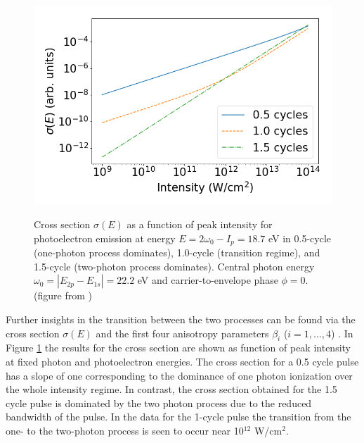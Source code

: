 \begin{figure}[!ht]
\centering
\includegraphics[width=0.49\linewidth]{figs/Photo_ionization/short_pulse/beta_0_cyc.png}\\
\caption{Cross section $\sigma(E)$ as a function of peak intensity for photoelectron emission at energy $E = 2\omega_0 - I_p = 18.7$ eV in 0.5-cycle (one-photon process dominates), 1.0-cycle (transition regime), and 1.5-cycle (two-photon process dominates). Central photon energy $\omega_0 = |E_{2p} - E_{1s}| = 22.2$ eV and carrier-to-envelope phase $\phi=0$.  (figure from \cite{venzke2020_ionization})
} 
  \label{fig:cross}
\end{figure}

Further insights in the transition between the two processes can be found via the cross section $\sigma(E)$
and the first four anisotropy parameters $\beta_i$ ($i = 1, \ldots, 4$) . In Figure \ref{fig:cross} the results for the cross section are shown as function of peak intensity at fixed photon and photoelectron energies. The cross section for a 0.5 cycle pulse has a slope of one corresponding to the dominance of one photon ionization over the whole intensity regime. In contrast, the cross section obtained for the 1.5 cycle pulse is dominated by the two photon process due to the reduced bandwidth of the pulse. In the data for the 1-cycle pulse the transition from the one- to the two-photon process is seen to occur near 10$^{12}$ W/cm$^2$. 

